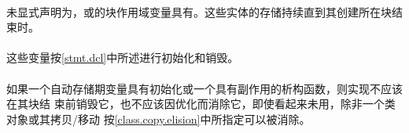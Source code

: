 \paragraph{} %
未显式声明为，或的块作用域变量具有。这些实体的存储持续直到其创建所在块结束时。

\paragraph{} %
\begin{note}
  这些变量按\ref{stmt.dcl}中所述进行初始化和销毁。
\end{note}

\paragraph{} %
如果一个自动存储期变量具有初始化或一个具有副作用的析构函数，则实现不应该在其块结
束前销毁它，也不应该因优化而消除它，即使看起来未用，除非一个类对象或其拷贝/移动
按\ref{class.copy.elision}中所指定可以被消除。
